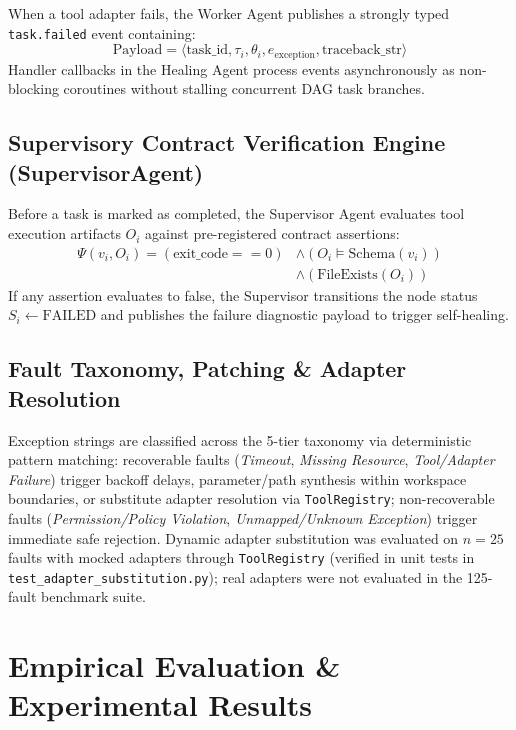 \documentclass[conference]{IEEEtran}
\newcommand{\chg}[1]{{\color{blue}#1}}
\begin{document}
When a tool adapter fails, the Worker Agent publishes a strongly typed \texttt{task.failed} event containing:
\begin{equation}
\text{Payload} = \langle \text{task\_id}, \tau_i, \theta_i, e_{\text{exception}}, \text{traceback\_str} \rangle
\end{equation}
Handler callbacks in the Healing Agent process events asynchronously as non-blocking coroutines without stalling concurrent DAG task branches.

\subsection{Supervisory Contract Verification Engine (SupervisorAgent)}
Before a task is marked as completed, the Supervisor Agent evaluates tool execution artifacts $O_i$ against pre-registered contract assertions:
\begin{align}
\Psi(v_i, O_i) = (\text{exit\_code} == 0) &\land (O_i \models \text{Schema}(v_i)) \nonumber \\
&\land (\text{FileExists}(O_i))
\end{align}
If any assertion evaluates to false, the Supervisor transitions the node status $S_i \leftarrow \text{FAILED}$ and publishes the failure diagnostic payload to trigger self-healing.

\subsection{Fault Taxonomy, Patching \& Adapter Resolution}
Exception strings are classified across the 5-tier taxonomy via deterministic pattern matching: recoverable faults (\textit{Timeout}, \textit{Missing Resource}, \textit{Tool/Adapter Failure}) trigger backoff delays, parameter/path synthesis within workspace boundaries, or substitute adapter resolution via \texttt{ToolRegistry}; non-recoverable faults (\textit{Permission/Policy Violation}, \textit{Unmapped/Unknown Exception}) trigger immediate safe rejection. \chg{Dynamic adapter substitution was evaluated on $n=25$ faults with mocked adapters through \texttt{ToolRegistry} (verified in unit tests in \texttt{test\_adapter\_substitution.py}); real adapters were not evaluated in the 125-fault benchmark suite.}

\section{Empirical Evaluation \& Experimental Results}
\end{document}
